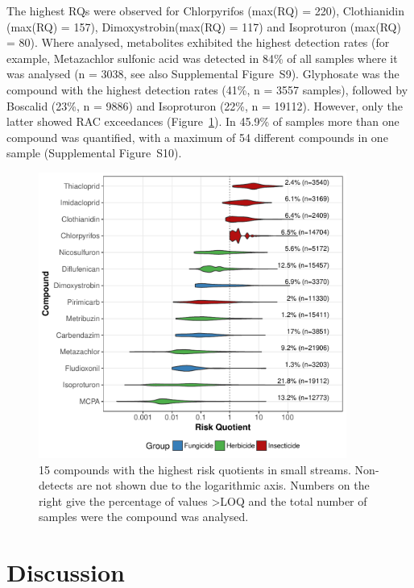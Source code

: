 The highest RQs were observed for Chlorpyrifos (max(RQ) = 220), Clothianidin (max(RQ) = 157), Dimoxystrobin(max(RQ) = 117) and Isoproturon (max(RQ) = 80). 
Where analysed, metabolites exhibited the highest detection rates (for example, Metazachlor sulfonic acid was detected in 84\% of all samples where it was analysed (n = 3038, see also Supplemental Figure~S9).
Glyphosate was the compound with the highest detection rates (41\%, n = 3557 samples), followed by Boscalid (23\%, n = 9886) and Isoproturon (22\%, n = 19112). 
However, only the latter showed RAC exceedances (Figure~\ref{fig:ss:fig6}).
In 45.9\% of samples more than one compound was quantified, with a maximum of 54 different compounds in one sample (Supplemental Figure~S10). 

\begin{figure}[H]
  \includegraphics[width=0.9\textwidth]{chapters/smallstreams/figure6.pdf}
  \caption[15 compounds with the highest risk quotients in small streams.]{15 compounds with the highest risk quotients in small streams. Non-detects are not shown due to the logarithmic axis. Numbers on the right give the percentage of values \textgreater LOQ and the total number of samples were the compound was analysed.
  }
  \label{fig:ss:fig6}
\end{figure}




\section{Discussion}
